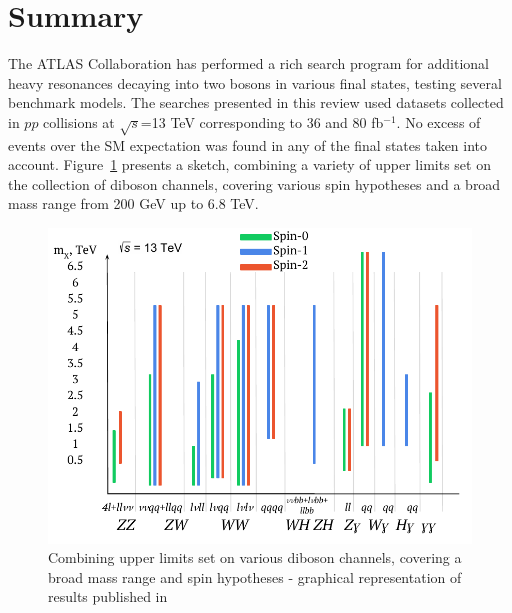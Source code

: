 \documentclass{PoS}
\begin{document}
\vspace*{-2mm}
\section{Summary}
\label{sec:sum}
\vspace*{-2mm}
The ATLAS Collaboration has performed a rich search program for additional heavy resonances decaying into two bosons in various final states, testing several benchmark models.
The searches presented in this review used datasets collected in $pp$ collisions at $\sqrt{s}$=13 TeV corresponding to 36 and 80 fb$^{-1}$.
No excess of events over the SM expectation was found in any of the final states taken into account. 
Figure~\ref{fig:summary} presents a sketch, combining a variety of upper limits set on the collection of diboson channels, covering various spin hypotheses and a broad mass range from 200 GeV up to 6.8 TeV.
\vspace*{-4mm}
  \begin{figure}
    \begin{center} 
    \includegraphics[width=.53\textwidth]{figures/lim_sketch}
    \end{center}
\vspace*{-8mm}
     \caption{Combining upper limits set on various diboson channels, covering a broad mass range and spin hypotheses - graphical representation of results published in \cite{HIGG-2016-31,HIGG-2016-19,ATLAS-CONF-2018-016,EXOT-2016-30,EXOT-2016-29,EXOT-2016-28,HIGG-2016-17,EXOT-2016-10-2}}
     \label{fig:summary}
     \end{figure}

\vspace*{-3mm}



%
\end{document}
